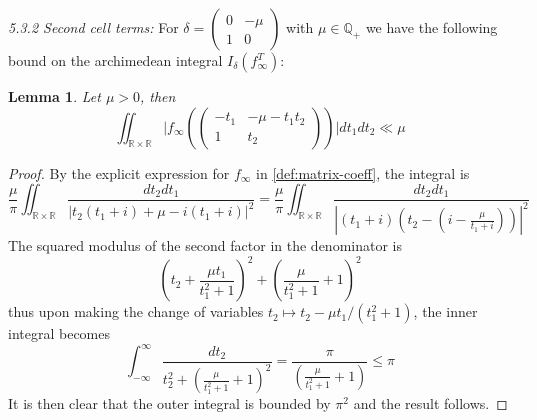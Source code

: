 \documentclass{article}
\newtheorem{lemma}[theorem]{Lemma}
\numberwithin{equation}{section}
\begin{document}
\noindent \emph{5.3.2 Second cell terms:}
For $\delta = \left(\begin{smallmatrix}
        0 & -\mu \\ 1 & 0
    \end{smallmatrix}\right)$ with $\mu \in \mathbb{Q_+}$ we have the following bound on the archimedean integral $I_\delta(f_\infty^T)$:
\begin{lemma}\label{lemma:second-cell-archim-bound}
Let $\mu > 0$, then
\begin{equation}
    \iint_{\mathbb{R}\times\mathbb{R}}\Bigr|f_\infty\left(\begin{pmatrix}
    -t_1 & -\mu-t_1t_2 \\ 1 & t_2
\end{pmatrix}\right)\Bigr|dt_1dt_2 \ll \mu
\end{equation}
\end{lemma}
\begin{proof}
    By the explicit expression for $f_\infty$ in \eqref{def:matrix-coeff}, the integral is
    $$\frac{\mu}{\pi}\iint_{\mathbb{R}\times \mathbb{R}}\frac{dt_2dt_1}{|t_2(t_1+i)+\mu-i(t_1+i)|^2} = \frac{\mu}{\pi} \iint_{\mathbb{R}\times \mathbb{R}}\frac{dt_2 dt_1}{|(t_1+i)(t_2-(i-\frac{\mu}{t_1+i}))|^2}$$
    The squared modulus of the second factor in the denominator  is
    $$\left(t_2+\frac{\mu t_1}{t_{1}^2+1}\right)^2+\left(\frac{\mu}{t_{1}^2+1}+1\right)^2$$
    thus upon making the change of variables $t_2\mapsto t_2-\mu t_1/(t_{1}^{2}+1)$, the inner integral becomes
    $$\int_{-\infty}^{\infty}\frac{dt_2}{t_2^2+(\frac{\mu}{t_1^2+1}+1)^2} = \frac{\pi}{\left(\frac{\mu}{t_1^2+1}+1\right)}\leq \pi$$
    It is then clear that the outer integral is bounded by $\pi^2$ and the result follows.
\end{proof}
\end{document}

